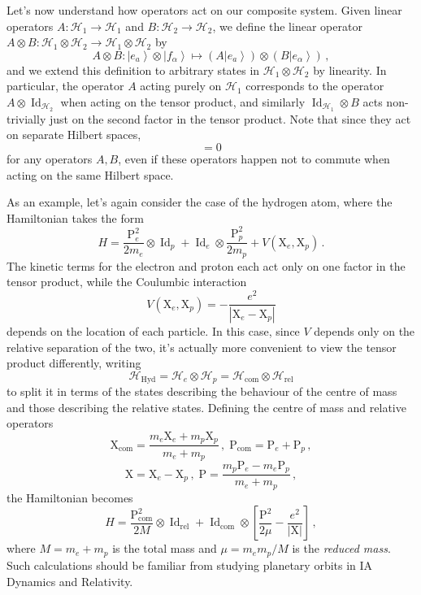 \documentclass{article}
\theoremstyle{plain}\theoremheaderfont{\normalfont\itshape}\theorembodyfont{\rmfamily}\theoremseparator{.}\newtheorem*{rem}{Remark}\newtheorem*{ex}{Example}\newtheorem*{proof}{Proof}\newtheorem*{altp}{Alternative proof}
\theoremstyle{plain}\theoremheaderfont{\normalfont\bfseries}\theorembodyfont{\rmfamily}\theoremseparator{.}\newtheorem{thm}{Theorem}[section]\newtheorem{lem}[thm]{Lemma}\newtheorem{prop}[thm]{Proposition}\newtheorem*{cor}{Corollary}\newtheorem{defn}[thm]{Definition}\newtheorem{clm}[thm]{Claim}\newtheorem{clminproof}{Claim}
\theoremstyle{break}\theoremheaderfont{\normalfont\itshape}\theorembodyfont{\rmfamily}\theoremseparator{.\medskip}\newtheorem*{proofskip}{Proof}\newtheorem*{exs}{Examples}\newtheorem*{rems}{Remarks}
\theoremstyle{break}\theoremheaderfont{\normalfont\bfseries}\theorembodyfont{\rmfamily}\theoremseparator{.\medskip}\newtheorem{lemskip}[thm]{Lemma}\newtheorem{defnskip}[thm]{Definition}\newtheorem{propskip}[thm]{Proposition}\newtheorem{thmskip}[thm]{Theorem}
\numberwithin{equation}{section}
\newcommand{\ket}[1]{\left| #1 \right\rangle}
\newcommand{\vb}[1]{\bm{\mathrm{#1}}}
\newcommand{\abs}[1]{\left| #1 \right|}
\newcommand{\hb}{\mathcal{H}}
\DeclareMathOperator{\Id}{Id}
\begin{document}
    Let's now understand how operators act on our composite system. Given linear operators \(A:\hb_1\to\hb_1\) and \(B:\hb_2\to\hb_2\), we define the linear operator \(A\otimes B:\hb_1\otimes\hb_2\to\hb_1\otimes\hb_2\) by
    \begin{equation}
        A\otimes B:\ket{e_a}\otimes\ket{f_\alpha}\longmapsto(A\ket{e_a})\otimes(B\ket{e_\alpha})\,,
    \end{equation}
    and we extend this definition to arbitrary states in \(\hb_1\otimes\hb_2\) by linearity. In particular, the operator \(A\) acting purely on \(\hb_1\) corresponds to the operator \(A\otimes\Id_{\hb_2}\) when acting on the tensor product, and similarly \(\Id_{\hb_1}\otimes B\) acts non-trivially just on the second factor in the tensor product. Note that since they act on separate Hilbert spaces,
    \begin{equation}
        [A\otimes\Id_{\hb_2},\Id_{\hb_1}\otimes B]=0
    \end{equation}
    for any operators \(A,B\), even if these operators happen not to commute when acting on the same Hilbert space.

    As an example, let's again consider the case of the hydrogen atom, where the Hamiltonian takes the form
    \begin{equation}
        H=\frac{\vb{P}_e^2}{2m_e}\otimes\Id_p+\Id_e\otimes\frac{\vb{P}_p^2}{2m_p}+V(\vb{X}_e,\vb{X}_p)\,.
    \end{equation}
    The kinetic terms for the electron and proton each act only on one factor in the tensor product, while the Coulumbic interaction
    \begin{equation}
        V(\vb{X}_e,\vb{X}_p)=-\frac{e^2}{\abs{\vb{X}_e-\vb{X}_p}}
    \end{equation}
    depends on the location of each particle. In this case, since \(V\) depends only on the relative separation of the two, it's actually more convenient to view the tensor product differently, writing
    \begin{equation}
        \hb_{\text{Hyd}}=\hb_{e}\otimes\hb_{p}=\hb_{\text{com}}\otimes\hb_{\text{rel}}
    \end{equation}
    to split it in terms of the states describing the behaviour of the centre of mass and those describing the relative states. Defining the centre of mass and relative operators
    \begin{equation}
        \vb{X}_{\text{com}}=\frac{m_e\vb{X}_e+m_p\vb{X}_p}{m_e+m_p}\,,\;\vb{P}_{\text{com}}=\vb{P}_e+\vb{P}_p\,,
    \end{equation}
    \begin{equation}
        \vb{X}=\vb{X}_e-\vb{X}_p\,,\;\vb{P}=\frac{m_p\vb{P}_e-m_e\vb{P}_p}{m_e+m_p}\,,
    \end{equation}
    the Hamiltonian becomes
    \begin{equation}
        H=\frac{\vb{P}_{\text{com}}^2}{2M}\otimes\Id_{\text{rel}}+\Id_{\text{com}}\otimes\left[\frac{\vb{P}^2}{2\mu}-\frac{e^2}{\abs{\vb{X}}}\right]\,,
    \end{equation}
    where \(M=m_e+m_p\) is the total mass and \(\mu=m_em_p/M\) is the \textit{reduced mass}. Such calculations should be familiar from studying planetary orbits in IA Dynamics and Relativity.
\end{document}
